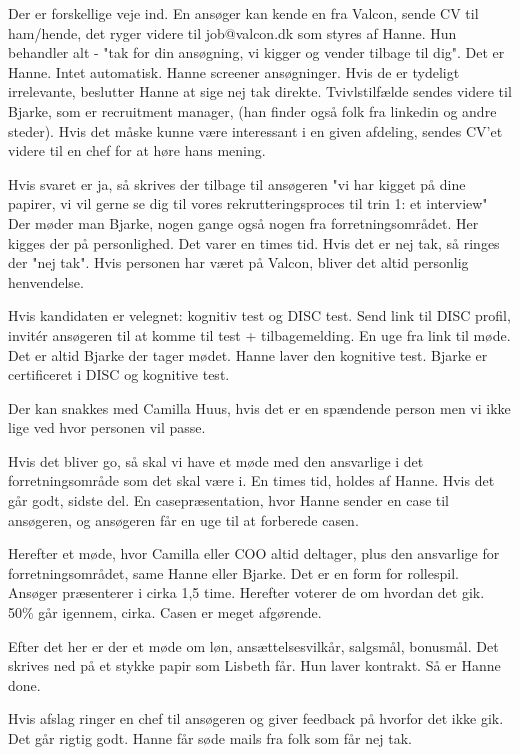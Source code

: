 \begin{linenumbers*}
Der er forskellige veje ind. En ansøger kan kende en fra Valcon, sende CV til ham/hende, det ryger videre til job@valcon.dk som styres af Hanne.
Hun behandler alt - "tak for din ansøgning, vi kigger og vender tilbage til dig". Det er Hanne. Intet automatisk.
Hanne screener ansøgninger. Hvis de er tydeligt irrelevante, beslutter Hanne at sige nej tak direkte. Tvivlstilfælde sendes videre til Bjarke, som er recruitment manager, (han finder også folk fra linkedin og andre steder).
Hvis det måske kunne være interessant i en given afdeling, sendes CV'et videre til en chef for at høre hans mening. 

Hvis svaret er ja, så skrives der tilbage til ansøgeren "vi har kigget på dine papirer, vi vil gerne se dig til vores rekrutteringsproces til trin 1: et interview" Der møder man Bjarke, nogen gange også nogen fra forretningsområdet.
Her kigges der på personlighed. Det varer en times tid.
Hvis det er nej tak, så ringes der "nej tak". Hvis personen har været på Valcon, bliver det altid personlig henvendelse.

Hvis kandidaten er velegnet: kognitiv test og DISC test. Send link til DISC profil, invitér ansøgeren til at komme til test + tilbagemelding.
En uge fra link til møde. Det er altid Bjarke der tager mødet. Hanne laver den kognitive test. Bjarke er certificeret i DISC og kognitive test.

Der kan snakkes med Camilla Huus, hvis det er en spændende person men vi ikke lige ved hvor personen vil passe. 

Hvis det bliver go, så skal vi have et møde med den ansvarlige i det forretningsområde som det skal være i. En times tid, holdes af Hanne.
Hvis det går godt, sidste del. En casepræsentation, hvor Hanne sender en case til ansøgeren, og ansøgeren får en uge til at forberede casen.

Herefter et møde, hvor Camilla eller COO altid deltager, plus den ansvarlige for forretningsområdet, same Hanne eller Bjarke. Det er en form for rollespil.
Ansøger præsenterer i cirka 1,5 time. 
Herefter voterer de om hvordan det gik. 50\% går igennem, cirka. Casen er meget afgørende.

Efter det her er der et møde om løn, ansættelsesvilkår, salgsmål, bonusmål. Det skrives ned på et stykke papir som Lisbeth får. Hun laver kontrakt. Så er Hanne done.

Hvis afslag ringer en chef til ansøgeren og giver feedback på hvorfor det ikke gik. Det går rigtig godt. Hanne får søde mails fra folk som får nej tak.



\end{linenumbers*}

